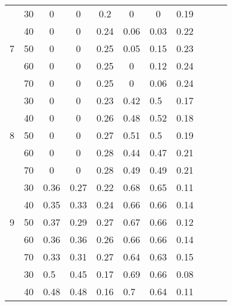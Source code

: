 \begin{table}[htbp]
\begin{tabular}{|c|c|p{3.855em}p{3.07em}c|p{3.855em}p{3.07em}c|ccc|}
    \midrule
          & 30    & \multicolumn{1}{c}{0} & \multicolumn{1}{c}{0} & 0.2   & \multicolumn{1}{c}{0} & \multicolumn{1}{c}{0} & 0.19  &       &       &  \\
          & 40    & \multicolumn{1}{c}{0} & \multicolumn{1}{c}{0} & 0.24  & 0.06  & 0.03  & 0.22  &       &       &  \\
    7     & 50    & \multicolumn{1}{c}{0} & \multicolumn{1}{c}{0} & 0.25  & 0.05  & 0.15  & 0.23  &       &       &  \\
          & 60    & \multicolumn{1}{c}{0} & \multicolumn{1}{c}{0} & 0.25  & \multicolumn{1}{c}{0} & 0.12  & 0.24  &       &       &  \\
          & 70    & \multicolumn{1}{c}{0} & \multicolumn{1}{c}{0} & 0.25  & \multicolumn{1}{c}{0} & 0.06  & 0.24  &       &       &  \\
    \midrule
          & 30    & \multicolumn{1}{c}{0} & \multicolumn{1}{c}{0} & 0.23  & 0.42  & 0.5   & 0.17  &       &       &  \\
          & 40    & \multicolumn{1}{c}{0} & \multicolumn{1}{c}{0} & 0.26  & 0.48  & 0.52  & 0.18  &       &       &  \\
    8     & 50    & \multicolumn{1}{c}{0} & \multicolumn{1}{c}{0} & 0.27  & 0.51  & 0.5   & 0.19  &       &       &  \\
          & 60    & \multicolumn{1}{c}{0} & \multicolumn{1}{c}{0} & 0.28  & 0.44  & 0.47  & 0.21  &       &       &  \\
          & 70    & \multicolumn{1}{c}{0} & \multicolumn{1}{c}{0} & 0.28  & 0.49  & 0.49  & 0.21  &       &       &  \\
    \midrule
          & 30    & 0.36  & 0.27  & 0.22  & 0.68  & 0.65  & 0.11  &       &       &  \\
          & 40    & 0.35  & 0.33  & 0.24  & 0.66  & 0.66  & 0.14  &       &       &  \\
    9     & 50    & 0.37  & 0.29  & 0.27  & 0.67  & 0.66  & 0.12  &       &       &  \\
          & 60    & 0.36  & 0.36  & 0.26  & 0.66  & 0.66  & 0.14  &       &       &  \\
          & 70    & 0.33  & 0.31  & 0.27  & 0.64  & 0.63  & 0.15  &       &       &  \\
    \midrule
          & 30    & 0.5   & 0.45  & 0.17  & 0.69  & 0.66  & 0.08  &       &       &  \\
          & 40    & 0.48  & 0.48  & 0.16  & 0.7   & 0.64  & 0.11  &       &       &  \\

\end{tabular}
\end{table}
